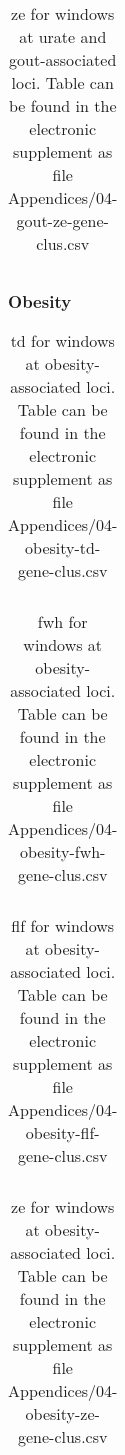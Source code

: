 \documentclass[]{report}
\begin{document}
\begin{appendices}
\begin{table}[!htb]
\caption[\gls{ze} for windows at urate and gout-associated loci.]{\gls{ze} for windows at urate and gout-associated loci. Table can be found in the electronic supplement as file Appendices/04-gout-ze-gene-clus.csv}
\centering
  \begin{tabular}{l l}
  \end{tabular}
  \label{tab:goutzegeneclus}
\end{table}

\FloatBarrier

\subsubsection{Obesity}\label{obesity}

\begin{table}[!htb]
\caption[\gls{td} for windows at obesity-associated loci.]{\gls{td} for windows at obesity-associated loci. Table can be found in the electronic supplement as file Appendices/04-obesity-td-gene-clus.csv}
\centering
  \begin{tabular}{l l}
  \end{tabular}
  \label{tab:obesitytdgeneclus}
\end{table}

\begin{table}[!htb]
\caption[\gls{fwh} for windows at obesity-associated loci.]{\gls{fwh} for windows at obesity-associated loci. Table can be found in the electronic supplement as file Appendices/04-obesity-fwh-gene-clus.csv}
\centering
  \begin{tabular}{l l}
  \end{tabular}
  \label{tab:obesityfwhgeneclus}
\end{table}

\begin{table}[!htb]
\caption[\gls{flf} for windows at obesity-associated loci.]{\gls{flf} for windows at obesity-associated loci. Table can be found in the electronic supplement as file Appendices/04-obesity-flf-gene-clus.csv}
\centering
  \begin{tabular}{l l}
  \end{tabular}
  \label{tab:obesityflfgeneclus}
\end{table}

\begin{table}[!htb]
\caption[\gls{ze} for windows at obesity-associated loci.]{\gls{ze} for windows at obesity-associated loci. Table can be found in the electronic supplement as file Appendices/04-obesity-ze-gene-clus.csv}
\centering
  \begin{tabular}{l l}
  \end{tabular}
  \label{tab:obesityzegeneclus}
\end{table}


\end{appendices}
\end{document}

